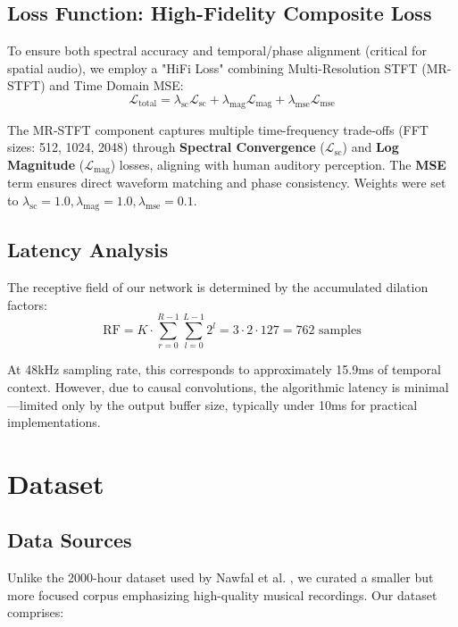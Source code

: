 \documentclass[10pt,twocolumn]{article}
\begin{document}
\subsection{Loss Function: High-Fidelity Composite Loss}

To ensure both spectral accuracy and temporal/phase alignment (critical for spatial audio), we employ a "HiFi Loss" combining Multi-Resolution STFT (MR-STFT) and Time Domain MSE:
\begin{equation}
    \mathcal{L}_{\text{total}} = \lambda_{\text{sc}} \mathcal{L}_{\text{sc}} + \lambda_{\text{mag}} \mathcal{L}_{\text{mag}} + \lambda_{\text{mse}} \mathcal{L}_{\text{mse}}
\end{equation}

The MR-STFT component captures multiple time-frequency trade-offs (FFT sizes: 512, 1024, 2048) through \textbf{Spectral Convergence} ($\mathcal{L}_{\text{sc}}$) and \textbf{Log Magnitude} ($\mathcal{L}_{\text{mag}}$) losses, aligning with human auditory perception. The \textbf{MSE} term ensures direct waveform matching and phase consistency. Weights were set to $\lambda_{\text{sc}}=1.0, \lambda_{\text{mag}}=1.0, \lambda_{\text{mse}}=0.1$.

\subsection{Latency Analysis}

The receptive field of our network is determined by the accumulated dilation factors:
\begin{equation}
    \text{RF} = K \cdot \sum_{r=0}^{R-1} \sum_{l=0}^{L-1} 2^l = 3 \cdot 2 \cdot 127 = 762 \text{ samples}
\end{equation}

At 48kHz sampling rate, this corresponds to approximately 15.9ms of temporal context. However, due to causal convolutions, the algorithmic latency is minimal---limited only by the output buffer size, typically under 10ms for practical implementations.

\section{Dataset}

\subsection{Data Sources}

Unlike the 2000-hour dataset used by Nawfal et al. \cite{nawfal2025ambisonics}, we curated a smaller but more focused corpus emphasizing high-quality musical recordings. Our dataset comprises:
\end{document}
